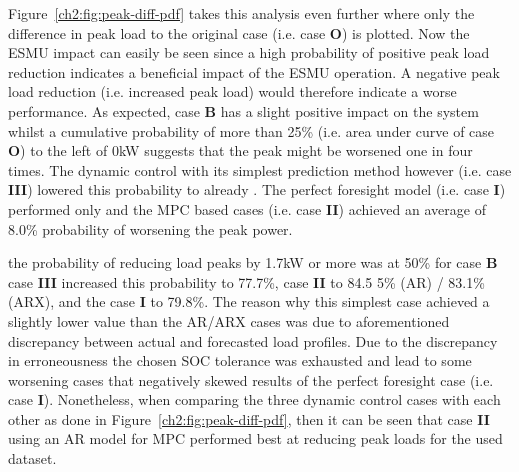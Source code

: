 

Figure~\ref{ch2:fig:peak-diff-pdf} takes this analysis even further where only the difference in peak load to the original case (i.e. case \textbf{O}) is plotted.
Now the ESMU impact can easily be seen since a high probability of positive peak load reduction indicates a beneficial impact of the ESMU operation.
A negative peak load reduction (i.e. increased peak load) would therefore indicate a worse performance.
As expected, case \textbf{B} has a slight positive impact on the system whilst a cumulative probability of more than 25\% (i.e. area under curve of case \textbf{O}) to the left of 0kW suggests that the peak might be worsened one in four times.
The dynamic control with its simplest prediction method however (i.e. case \textbf{III}) lowered this probability to already .
The perfect foresight model (i.e. case \textbf{I}) performed  only  and the MPC based cases (i.e. case \textbf{II}) achieved an average of 8.0\% probability of worsening the peak power.

 the probability of reducing load peaks by 1.7kW or more was at 50\% for case \textbf{B}\hlrem{,} case \textbf{III} increased this probability to 77.7\%, case \textbf{II} to 84.5 5\% (AR) / 83.1\% (ARX), and the case \textbf{I} to 79.8\%.
The reason why this simplest case achieved a slightly lower value than the AR/ARX cases was due to aforementioned discrepancy between actual and forecasted load profiles.
Due to the discrepancy in erroneousness the chosen SOC tolerance was exhausted and lead to some worsening cases that negatively skewed results of the perfect foresight case (i.e. case \textbf{I}).
Nonetheless, when comparing the three dynamic control cases with each other as done in Figure~\ref{ch2:fig:peak-diff-pdf}, then it can be seen that case \textbf{II} using an AR model for MPC performed best at reducing peak loads for the used dataset.

